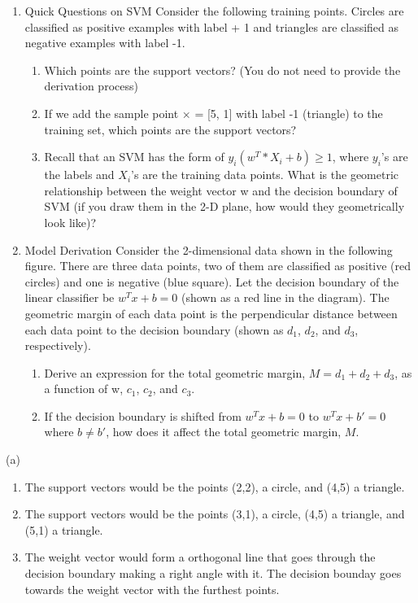 \documentclass{article}
\begin{document}
\begin{enumerate}[label=(\alph*)]
    \item Quick Questions on SVM Consider the following training points. Circles are classified as positive examples with label + 1 and triangles are classified as negative examples with label -1.
    \begin{enumerate}[label=(\roman*)]
        \item Which points are the support vectors? (You do not need to provide the derivation process)
        \item If we add the sample point × = [5, 1] with label -1 (triangle) to the training set, which points are the support vectors?
        \item Recall that an SVM has the form of $y_i(w^T * X_i + b) \ge 1$, where $y_i$'s are the labels and $X_i$'s are the training data points. What is the geometric relationship between the weight vector w and the decision boundary of SVM (if you draw them in the 2-D plane, how would they geometrically look like)?
    \end{enumerate}
    \item Model Derivation Consider the 2-dimensional data shown in the following figure. There are three data points, two of them are classified as positive (red circles) and one is negative (blue square). Let the decision boundary of the linear classifier be $w^Tx + b = 0$ (shown as a red line in the diagram).
    The geometric margin of each data point is the perpendicular distance between each data point to the decision boundary (shown as $d_1$, $d_2$, and $d_3$, respectively).
    \begin{enumerate}[label=(\roman*)]
        \item Derive an expression for the total geometric margin, $M = d_1 + d_2 + d_3$, as a function of w, $c_1$, $c_2$, and $c_3$.
        \item If the decision boundary is shifted from $w^Tx + b= 0$ to $w^Tx + b'= 0$ where $b \ne b'$, how does it affect the total geometric margin, $M$.
    \end{enumerate}
\end{enumerate}

(a)
\begin{enumerate}[label=(\roman*)]
    \item The support vectors would be the points (2,2), a circle, and (4,5) a triangle.
    \item The support vectors would be the points (3,1), a circle, (4,5) a triangle, and (5,1) a triangle.
    \item The weight vector would form a orthogonal line that goes through the decision boundary making a right angle with it. The decision bounday goes towards the weight vector with the furthest points. 
\end{enumerate}
\end{document}
